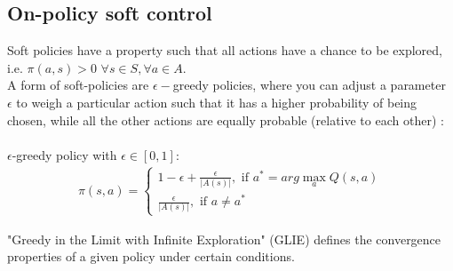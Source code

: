 \subsection{On-policy soft control}

Soft policies have a property such that all actions have a chance to be explored, i.e. $\pi(a, s) > 0$ $\forall s \in S, \forall a \in A.$\\

A form of soft-policies are $\epsilon-$greedy policies, where 
you can adjust a parameter $\epsilon$ to weigh a particular action such that it has a higher probability of being chosen,
while all the other actions are equally probable (relative to each other) \cite{lecture_mfc}:\\\\
$\epsilon$-greedy policy with $\epsilon \in [0, 1]$:
\begin{align}
    \pi(s, a) = \begin{cases} 
        1 - \epsilon + \frac{\epsilon}{|A(s)|}, \text{ if } a^{*} = arg \max_{a} Q(s, a) \\
        \frac{\epsilon}{|A(s)|}, \text{ if }  a \neq a^*
    \end{cases}   
\end{align}

"Greedy in the Limit with Infinite Exploration" \cite{lecture_mfc} (GLIE) defines the convergence properties of a given policy under certain conditions. 




